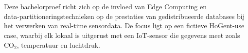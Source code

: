 
%
%
%
%
%

%



\chapter*{}

Deze bachelorproef richt zich op de invloed van Edge Computing en \\ data-partitioneringstechnieken op de prestaties van gedistribueerde databases bij het verwerken van real-time sensordata. De focus ligt op een fictieve HoGent-use case, waarbij elk lokaal is uitgerust met een IoT-sensor die gegevens meet zoals CO$_2$, temperatuur en luchtdruk.

